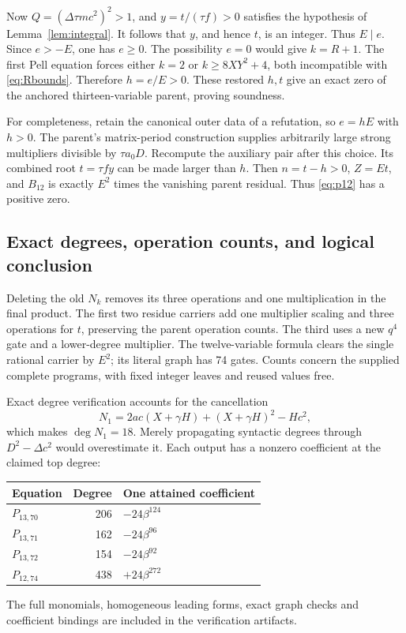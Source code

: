 \documentclass[11pt]{article}
\theoremstyle{remark}\newtheorem{remark}[theorem]{Remark}
\begin{document}
Now $Q=(\Delta\tau mc^2)^2>1$, and
$y=t/(\tau f)>0$ satisfies the hypothesis of
Lemma~\ref{lem:integral}. It follows that $y$, and hence $t$, is an
integer. Thus $E\mid e$. Since $e>-E$, one has $e\ge0$.
The possibility $e=0$ would give $k=R+1$. The first Pell equation
forces either $k=2$ or $k\ge8XY^2+4$, both incompatible with
\eqref{eq:Rbounds}. Therefore $h=e/E>0$. These restored $h,t$ give
an exact zero of the anchored thirteen-variable parent, proving soundness.

For completeness, retain the canonical outer data of a refutation,
so $e=hE$ with $h>0$. The parent's matrix-period construction supplies
arbitrarily large strong multipliers divisible by $\tau a_0D$.
Recompute the auxiliary pair after this choice. Its combined root
$t=\tau f y$ can be made larger than $h$. Then $n=t-h>0$, $Z=Et$,
and $B_{12}$ is exactly $E^2$ times the vanishing parent residual.
Thus \eqref{eq:p12} has a positive zero.

\subsection{Exact degrees, operation counts, and logical conclusion}

Deleting the old $N_k$ removes its three operations and one multiplication
in the final product. The first two residue carriers add one multiplier
scaling and three operations for $t$, preserving the parent operation
counts. The third uses a new $q^4$ gate and a lower-degree multiplier.
The twelve-variable formula clears the single rational carrier by $E^2$;
its literal graph has 74 gates. Counts concern the supplied complete
programs, with fixed integer leaves and reused values free.

Exact degree verification accounts for the cancellation
\[
 N_1=2ac(X+\gamma H)+(X+\gamma H)^2-Hc^2,
\]
which makes $\deg N_1=18$. Merely propagating syntactic degrees
through $D^2-\Delta c^2$ would overestimate it. Each output has a
nonzero coefficient at the claimed top degree:
\begin{center}\small
\begin{tabular}{@{}lrl@{}}
\toprule
Equation & Degree & One attained coefficient\\
\midrule
$P_{13,70}$ &206&$-24\beta^{124}$\\
$P_{13,71}$ &162&$-24\beta^{96}$\\
$P_{13,72}$ &154&$-24\beta^{92}$\\
$P_{12,74}$ &438&$+24\beta^{272}$\\
\bottomrule
\end{tabular}
\end{center}
The full monomials, homogeneous leading forms, exact graph checks and
coefficient bindings are included in the verification artifacts.
\end{document}
